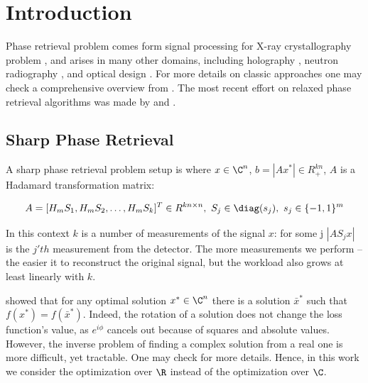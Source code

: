 \documentclass[11pt,letterpaper]{article}
\numberwithin{equation}{section} %
\numberwithin{figure}{section} %
\numberwithin{table}{section} %
\begin{document}
\section{Introduction} 

Phase retrieval problem comes form signal processing for X-ray crystallography problem \cite{harrison1993phase}, and arises in many other domains, including holography \cite{fienup1978reconstruction}, neutron radiography \cite{allman2000imaging}, and optical design \cite{farn1991new}. For more details on classic approaches one may check a comprehensive overview from \cite{luke2002optical}. The most recent effort on relaxed phase retrieval algorithms was made by \cite{Duchi2017PhaseRetrival} and \cite{davis2017nonsmooth}.


\subsection*{Sharp Phase Retrieval} 

A sharp phase retrieval problem setup is 
where $x \in \C^n$, $b = |Ax^*| \in R^{kn}_+$, $A$ is a Hadamard transformation matrix:

\[
    A = [H_mS_1, H_mS_2, \dots, H_mS_k]^T \in R^{kn\times n} ,\ S_j \in \diag(s_j), \ s_j \in \{-1, 1\}^m
\]

In this context $k$ is a number of measurements of the signal $x$: for some j $|AS_jx|$ is the $j'th$ measurement from the detector.  The more measurements we perform -- the easier it to reconstruct the original signal, but the workload also grows at least linearly with $k$. 

\cite{Duchi2017PhaseRetrival} showed that for any optimal solution $x^* \in \C^n$ there is a solution $\bar{x}^*$ such that $f(x^*) = f(\bar{x}^*)$. Indeed, the rotation of a solution does not change the loss function's value, as $e^{i\phi}$ cancels out because of squares and absolute values. However, the inverse problem of finding a complex solution from a real one is more difficult, yet tractable. One may check \cite{kek} for more details. Hence, in this work we consider the optimization over $\R$ instead of the optimization over $\C$.
\end{document}
